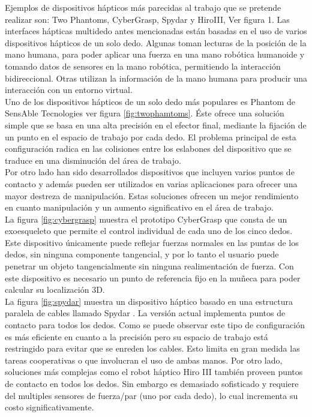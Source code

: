 Ejemplos de dispositivos hápticos más parecidas al trabajo que se pretende realizar son: Two Phantoms, CyberGrasp, Spydar y HiroIII, Ver figura 1.  Las interfaces hápticas multidedo antes mencionadas están basadas en el uso de varios dispositivos hápticos de un solo dedo. Algunas toman lecturas de la  posición de la mano humana, para poder aplicar una fuerza en una mano robótica humanoide y tomando datos de sensores en la mano robótica, permitiendo la interacción bidireccional. Otras utilizan la información de la mano humana para producir una interacción con un entorno virtual.\\

 Uno de los dispositivos hápticos de un solo dedo más populares es Phantom de SensAble Tecnologies ver figura \ref{fig:twophamtoms}. \'Este ofrece una solución simple que se basa en una alta precisión en el efector final, mediante la fijación de un punto en el espacio de trabajo por cada dedo. El problema principal de esta configuración radica en las colisiones entre los eslabones del dispositivo que se traduce en una disminución del área de trabajo.\\


Por otro lado han sido desarrollados dispositivos que incluyen varios puntos de contacto y además pueden ser utilizados en varias aplicaciones para ofrecer una mayor destreza de manipulación. Estas soluciones ofrecen un mejor rendimiento en cuanto manipulación y un aumento significativo en el área de trabajo.\\ 

La figura \ref{fig:cybergrasp} muestra el prototipo CyberGrasp que consta de un exoesqueleto que permite el control individual de cada uno de los cinco dedos. Este dispositivo únicamente puede reflejar fuerzas normales en las puntas de los dedos, sin ninguna componente tangencial, y por lo tanto el usuario puede penetrar un objeto tangencialmente sin ninguna realimentación de fuerza. Con este dispositivo es necesario un punto de referencia fijo en la muñeca para poder calcular su localización 3D.\\

 La figura \ref{fig:spydar} muestra un dispositivo háptico basado en una estructura paralela de cables llamado Spydar \cite{lopez2012mechanical}. La versión actual implementa puntos de contacto para todos los dedos. Como se puede observar este tipo de configuración es más eficiente en cuanto a la precisión pero su espacio de trabajo est\'a restringido para evitar que se enreden los cables. Esto limita en gran medida las tareas cooperativas o que involucran el uso de ambas manos. Por otro lado, soluciones más complejas como el robot háptico Hiro III\cite{Kawasaki,endo2008fpga,endo2011multi,kawasaki2003control,kawasakiforce,kawasaki2007design,mouri2005developments,mouri2006novel} también proveen puntos de contacto en todos los dedos. Sin embargo es demasiado sofisticado y requiere del multiples sensores de fuerza/par (uno por cada dedo), lo cual incrementa su costo significativamente.\\
 
